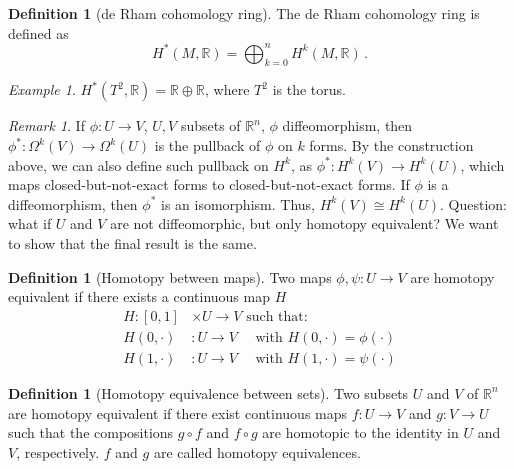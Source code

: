 \documentclass[a4paper,11pt,titlepage, article, oneside]{memoir}
\numberwithin{equation}{section}
\theoremstyle{definition}
\newtheorem{definition}[theorem]{Definition}
\theoremstyle{remark}
\newtheorem{remark}[theorem]{Remark}
\newtheorem{example}[theorem]{Example}
\newcommand{\rfield}{\mathbb{R}}
\begin{document}
\begin{definition}[de Rham cohomology ring]
  The de Rham cohomology ring is defined as
  \[ H^*(M, \rfield) = \bigoplus_{k=0}^n H^k(M, \rfield) \, .\]
\end{definition}

\begin{tcolorbox}\begin{example}
  $H^*(T^2, \rfield) = \rfield \oplus \rfield$, where $T^2$ is the torus.
\end{example}\end{tcolorbox}

\begin{remarkbox}\begin{remark}
  If $\phi \colon U \rightarrow V$, $U, V$ subsets of $\rfield^n$, $\phi$ diffeomorphism, then $\phi^* \colon \Omega^k(V) \rightarrow \Omega^k(U)$ is the pullback of $\phi$ on $k$ forms. By the construction above, we can also define such pullback on $H^k$, as $\phi^* \colon H^k(V) \rightarrow H^k(U)$, which maps closed-but-not-exact forms to closed-but-not-exact forms.
  If $\phi$ is a diffeomorphism, then $\phi^*$ is an isomorphism. Thus, $H^k(V) \cong H^k(U)$.
  Question: what if $U$ and $V$ are not diffeomorphic, but only homotopy equivalent? We want to show that the final result is the same.
 \end{remark}\end{remarkbox}

\begin{definition}[Homotopy between maps]
  Two maps $\phi, \psi \colon U \rightarrow V$ are homotopy equivalent if there exists a continuous map $H$
  \begin{align*}
    H \colon [0,1] &\times U \rightarrow V \text{ such that:}\\
    H(0, \cdot) &\colon U \rightarrow V \quad \text{ with } H(0, \cdot) = \phi(\cdot) \\
    H(1, \cdot) & \colon U \rightarrow V \quad \text{ with } H(1, \cdot) = \psi(\cdot)
  \end{align*}
\end{definition}

 \begin{definition}[Homotopy equivalence between sets]
   Two subsets $U$ and $V$ of $\rfield^n$ are homotopy equivalent if there exist continuous maps $f \colon U \rightarrow V$ and $g \colon V \rightarrow U$ such that the compositions $g \circ f$ and $f \circ g$ are homotopic to the identity in $U$ and $V$, respectively. $f$ and $g$ are called homotopy equivalences.
 \end{definition}
\end{document}
